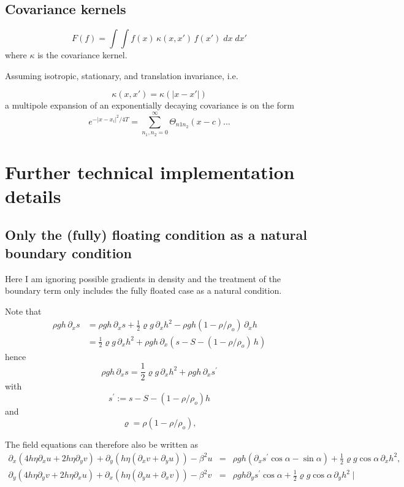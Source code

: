 \documentclass[10pt,a4paper]{book}
\newcommand{\p}{\partial}
\begin{document}
\section{Covariance kernels}


\[
F(f)= \int \int f(x) \, \kappa(x,x') \, f(x') \;dx \; dx' 
\]
where $\kappa$ is the covariance kernel.



Assuming isotropic, stationary, and translation invariance, i.e.

\[
\kappa(x,x')=\kappa(|x-x'|)
\]
a multipole expansion of an exponentially decaying covariance is on the form
\[e^{-|x-x_i|^2/4T}=\sum_{n_1,n_2=0}^{\infty} \Theta_{n1 n_2} (x-c) ...
\]



\chapter{Further technical implementation details}
 
\section{Only the (fully) floating condition as a natural boundary condition}

Here I am ignoring possible gradients in density and the treatment of
the boundary term only includes the fully floated case as a natural condition.


Note that
\begin{align*}
\rho g h \, \p_x s &=\rho g h \, \p_x s + \frac{1}{2} \varrho g \,\p_x h^2 - \rho g h (1-\rho/\rho_o)\, \p_x h \\
&=\frac{1}{2} \varrho g \,\p_x h^2 +\rho g h \, \p_x ( s -S - (1-\rho/\rho_o)\,  h )
\end{align*}
hence
\begin{equation}
\rho g h \, \p_x s =\frac{1}{2} \varrho g \,\p_x h^2 +\rho g h \, \p_x s^{'}
\label{eq:sdot}
\end{equation}
with
\[ 
s^{'} := s-S -(1-\rho/\rho_o) h 
 \]
and
\[
\varrho=\rho (1-\rho/\rho_o) ,
\]


The field equations can therefore also be written as
\begin{eqnarray} 
\p_x ( 4 h \eta \p_x u + 2 h \eta \p_y v) + \p_y ( h \eta (\p_x v + \p_y u)) - \beta^2 u 
&=&\rho g h (\p_x s^{'} \cos \alpha  -  \sin \alpha )    + \frac{1}{2} \varrho g  \cos \alpha \, \p_x h^2,\nonumber \\
\p_y ( 4 h \eta \p_y v + 2 h \eta \p_x u) +\p_x ( h \eta (\p_y u + \p_x v)) - \beta^2 v 
&=&\rho g h \p_y s^{'} \cos \alpha  +\frac{1}{2} \varrho g  \cos \alpha \, \p_y h^2\mid \nonumber
\end{eqnarray}
\end{document}
